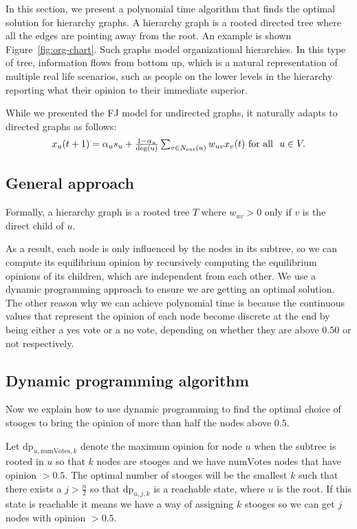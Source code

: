 
In this section, we present a polynomial time algorithm that finds the optimal solution for hierarchy graphs. A hierarchy graph is a rooted directed tree where all the edges are pointing away from the root. An example is shown Figure~\ref{fig:org-chart}. Such graphs model organizational hierarchies. 
In this type of tree, information flows from bottom up, which is a natural representation of multiple real life scenarios, such as people on the lower levels in the hierarchy reporting what their opinion to their immediate superior. 

While we presented the FJ model for undirected graphs, it naturally adapts to directed graphs as follows:  
\begin{align*}
\textstyle x_u(t+1) = \alpha_u s_u + \frac{1-\alpha_u}{\deg(u)} \sum_{v \in N_{\mathrm{out}}(u)}  w_{uv} x_v(t) \hfill \text{~for all~~}u \in V.
\end{align*}
\subsection{General approach}

Formally, a hierarchy graph is a rooted tree $T$ where $w_{uv} > 0$ only if $v$ is the direct child of $u$.

%
As a result, each node is only influenced by the nodes in its subtree, so we can compute its equilibrium opinion by recursively computing the equilibrium opinions of its children, which are independent from each other. We use a dynamic programming approach to ensure we are getting an optimal solution. 
%
The other reason why we can achieve polynomial time is because the continuous values that represent the opinion of each node become discrete at the end by being either a \textsf{yes} vote or a \textsf{no} vote,  depending on whether they are above $0.50$ or not respectively.  
%

\subsection{Dynamic programming algorithm}

Now we explain how to use dynamic programming to find the optimal choice of stooges to bring the opinion of more than half the nodes above $0.5$.

Let $\text{dp}_{u,\text{numVotes},k}  $ denote the maximum opinion for node $u$ when the subtree is rooted in $u$ so that $k$ nodes are stooges and we have $\text{numVotes}$ nodes that have opinion $>0.5$.
The optimal number of stooges will be the smallest $k$ such that there exists a $j > \frac{n}{2}$ so that $\text{dp}_{u, j, k}$ is a reachable state, where $u$ is the root. If this state is reachable it means we have a way of assigning $k$ stooges so we can get $j$ nodes with opinion $>0.5$.


